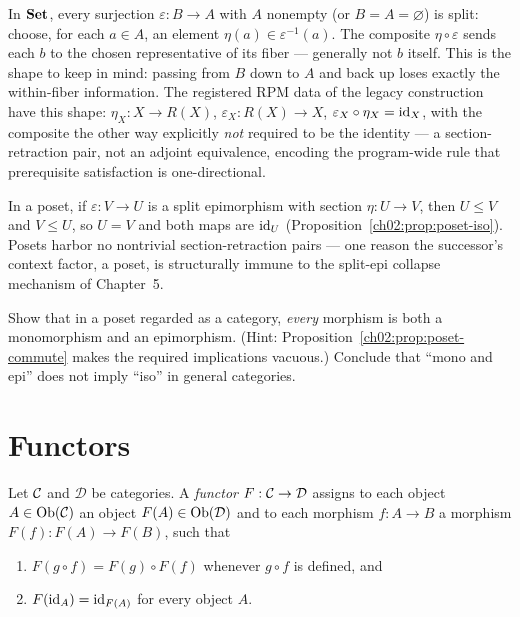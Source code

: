 \begin{example}\label{ch02:ex:split-in-set}
In $\mathbf{Set}$, every surjection $\varepsilon : B \to A$ with $A$ nonempty (or
$B = A = \varnothing$) is split: choose, for each $a \in A$, an element
$\eta(a) \in \varepsilon^{-1}(a)$. The composite $\eta \circ \varepsilon$
sends each $b$ to the chosen representative of its fiber --- generally
not $b$ itself. This is the shape to keep in mind: passing from $B$ down
to $A$ and back up loses exactly the within-fiber information. The
registered RPM data of the legacy construction have this shape:
$\eta_X : X \to R(X)$, $\varepsilon_X : R(X) \to X$,
$\varepsilon_X \circ \eta_X = \mathrm{id}_X$, with the composite the other way
explicitly \emph{not} required to be the identity --- a
section-retraction pair, not an adjoint equivalence, encoding the
program-wide rule that prerequisite satisfaction is one-directional.
\end{example}

\begin{remark}\label{ch02:rem:no-split-in-posets}
In a poset, if $\varepsilon : V \to U$ is a split epimorphism with
section $\eta : U \to V$, then $U \le V$ and $V \le U$, so $U = V$ and
both maps are $\mathrm{id}_U$ (Proposition~\ref{ch02:prop:poset-iso}). Posets
harbor no nontrivial section-retraction pairs --- one reason the
successor's context factor, a poset, is structurally immune to the
split-epi collapse mechanism of Chapter~5.
\end{remark}

\begin{exercise}\label{ch02:exr:poset-monoepi}
Show that in a poset regarded as a category, \emph{every} morphism is
both a monomorphism and an epimorphism. (Hint:
Proposition~\ref{ch02:prop:poset-commute} makes the required implications
vacuous.) Conclude that ``mono and epi'' does not imply ``iso'' in
general categories.
\end{exercise}

\section{Functors}\label{ch02:sec:functors}

\begin{definition}[Functor]\label{ch02:def:functor}
Let $\mathcal{C}$ and $\mathcal{D}$ be categories. A \emph{functor}
$F : \mathcal{C} \to \mathcal{D}$ assigns to each object $A \in \mathrm{Ob}(\mathcal{C})$ an
object $F(A) \in \mathrm{Ob}(\mathcal{D})$ and to each morphism $f : A \to B$ a
morphism $F(f) : F(A) \to F(B)$, such that
\begin{enumerate}
\item[(F1)] $F(g \circ f) = F(g) \circ F(f)$ whenever $g \circ f$ is
defined, and
\item[(F2)] $F(\mathrm{id}_A) = \mathrm{id}_{F(A)}$ for every object $A$.
\end{enumerate}
\end{definition}

